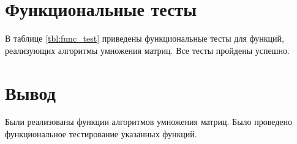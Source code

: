 \section{Функциональные тесты}

В таблице \ref{tbl:func_test} приведены функциональные тесты для функций, реализующих алгоритмы умножения матриц. Все тесты пройдены успешно.


\section{Вывод}

Были реализованы функции алгоритмов умножения матриц. Было проведено функциональное тестирование указанных функций.